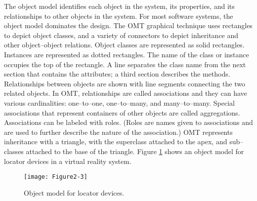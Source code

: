 The object model identifies each object in the system, its properties, and its relationships to other objects in the system. For most software systems, the object model dominates the design. The OMT graphical technique uses rectangles to depict object classes, and a variety of connectors to depict inheritance and other object--object relations. Object classes are represented as solid rectangles. Instances are represented as dotted rectangles. The name of the class or instance occupies the top of the rectangle. A line separates the class name from the next section that contains the attributes; a third section describes the methods. Relationships between objects are shown with line segments connecting the two related objects. In OMT, relationships are called associations and they can have various cardinalities: one--to--one, one--to--many, and many--to--many. Special associations that represent containers of other objects are called aggregations. Associations can be labeled with roles. (Roles are names given to associations and are used to further describe the nature of the association.) OMT represents inheritance with a triangle, with the superclass attached to the apex, and sub--classes attached to the base of the triangle. Figure \ref{fig:Figure2-3} shows an object model for locator devices in a virtual reality system.

\begin{figure}[!htb]
	\centering
	\texttt{[image: Figure2-3]}
	\caption{Object model for locator devices.}
	\label{fig:Figure2-3}
\end{figure}

